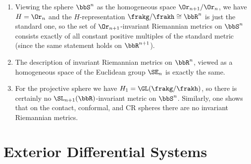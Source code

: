 \begin{example}
    \begin{enumerate}
        \item Viewing the sphere $\bbS^n$ as the homogeneous space $\Or_{n+1}\slash \Or_n$, we have $H=\Or_n$ and the $H$-representation $\frakg\slash\frakh\cong\bbR^n$ is just the standard one, so the set of $\Or_{n+1}$-invariant Riemannian metrics on $\bbS^n$ consists exactly of all constant positive multiples of the standard metric (since the same statement holds on $\bbR^{n+1}$).
        \item The description of invariant Riemannian metrics on $\bbR^n$, viewed as a homogeneous space of the Euclidean group $\SE_n$ is exactly the same. 
        \item For the projective sphere we have $H_1=\GL(\frakg\slash\frakh)$, so there is certainly no $\SL_{n+1}(\bbR)$-invariant metric on $\bbS^n$. Similarly, one shows that on the contact, conformal, and CR spheres there are no invariant Riemannian metrics.
    \end{enumerate}
\end{example}

















\clearpage
\section{Exterior Differential Systems}\label{sec: PDEs}



